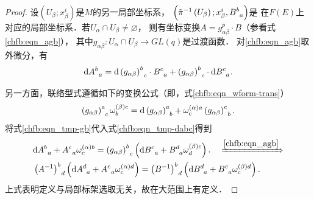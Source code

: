 \begin{proof}
设$\left(U_{\beta} ; x_{\beta}^{i}\right)$是$M$的另一局部坐标系，
$\left(\tilde{\pi}^{-1}\left(U_{\beta}\right) ; x_{\beta}^{i}, B_{\hphantom{a}a}^{b}\right)$是
在$F(E)$上对应的局部坐标系．若$U_{\alpha} \cap U_{\beta} \neq \varnothing$，
则有坐标变换$A=g_{\alpha \beta}^p \cdot B$（参看式\eqref{chfb:eqn_agb}），
其中$g_{\alpha \beta}: U_{\alpha} \cap U_{\beta} \rightarrow GL(q)$是过渡函数．
对\eqref{chfb:eqn_agb}取外微分，有
\begin{equation}\label{chfb:eqn_tmp-dabc}
    \mathrm{d} A_{\hphantom{a}a}^{b}=\mathrm{d}\left(g_{\alpha \beta}\right)_{\hphantom{a}c}^{b} \cdot 
    B_{\hphantom{a}a}^{c}+\left(g_{\alpha \beta}\right)_{\hphantom{a}c}^{b} \cdot \mathrm{d} B_{\hphantom{a}a}^{c}.
\end{equation}

另一方面，联络型式遵循如下的变换公式（即，式\eqref{chfb:eqn_wform-trans}）
\begin{equation}\label{chfb:eqn_tmp-gb}
    \left(g_{\alpha \beta}\right)_{\hphantom{a}c}^{a} \omega_{b}^{(\beta) c}=\mathrm{d}
    \left(g_{\alpha\beta}\right)_{\hphantom{a}b}^{a}+
    \omega_{c}^{(\alpha) a} \left(g_{\alpha \beta}\right)_{\hphantom{a}b}^{c}.
\end{equation}
将式\eqref{chfb:eqn_tmp-gb}代入式\eqref{chfb:eqn_tmp-dabc}得到 
\begin{align*}
    &\mathrm{d} A_{\hphantom{a}a}^{b}+A_{\hphantom{a}a}^{c}  \omega_{c}^{(\alpha) b}
    =\left(g_{\alpha \beta}\right)_{\hphantom{a}c}^{b}\left(\mathrm{d} B_{\hphantom{a}a}^{c}
    +B_{\hphantom{a}a}^{d}  \omega_{d}^{(\beta) c}\right).
\quad \xRightarrow{\ref{chfb:eqn_agb}} \\
&\left(A^{-1}\right)_{\hphantom{a}d}^{b} \left(\mathrm{d} A_{\hphantom{a}a}^{d}
+A_{\hphantom{a}a}^{c}  \omega_{c}^{(\alpha) d}\right)
=\left(B^{-1}\right)_{\hphantom{a}d}^{b}\left(\mathrm{d} B_{\hphantom{a}a}^{d}
+B_{\hphantom{a}a}^{c}  \omega_{c}^{(\beta) d}\right) .
\end{align*}
上式表明定义与局部标架选取无关，故在大范围上有定义．
\end{proof}


